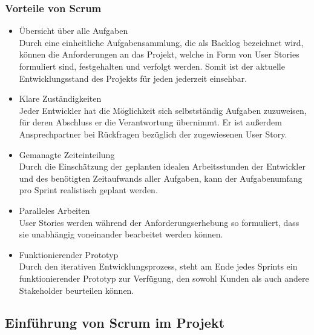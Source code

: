 \subsubsection{Vorteile von Scrum}
\begin{itemize}
\item Übersicht über alle Aufgaben\vspace{0.1cm}\\ 
Durch eine einheitliche Aufgabensammlung, die als Backlog bezeichnet wird, können die Anforderungen an das Projekt, welche in Form von User Stories formuliert sind, festgehalten und verfolgt werden. Somit ist der aktuelle Entwicklungsstand des Projekts für jeden jederzeit einsehbar. \vspace{0.1cm}

\item Klare Zuständigkeiten\vspace{0.1cm}\\ 
Jeder Entwickler hat die Möglichkeit sich selbstständig Aufgaben zuzuweisen, für deren Abschluss er die Verantwortung übernimmt. Er ist außerdem Ansprechpartner bei Rückfragen bezüglich der zugewiesenen User Story. \vspace{0.1cm}

\item Gemanagte Zeiteinteilung\vspace{0.1cm}\\ 
Durch die Einschätzung der geplanten idealen Arbeitsstunden der Entwickler und des benötigten Zeitaufwands aller Aufgaben, kann der Aufgabenumfang pro Sprint realistisch geplant werden.\vspace{0.1cm}

\item Paralleles Arbeiten\vspace{0.1cm}\\ 
User Stories werden während der Anforderungserhebung so formuliert, dass sie unabhängig voneinander bearbeitet werden können.\vspace{0.1cm}
\item Funktionierender Prototyp\vspace{0.1cm}\\ 
Durch den iterativen Entwicklungsprozess, steht am Ende jedes Sprints ein funktionierender Prototyp zur Verfügung, den sowohl Kunden als auch andere Stakeholder beurteilen können. 

\end{itemize}

\subsection{Einführung von Scrum im Projekt}
